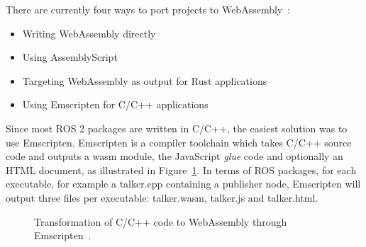     There are currently four ways to port projects to WebAssembly~\cite{portingwasm}:
    
    \begin{itemize}
        \item Writing WebAssembly directly
        \item Using AssemblyScript
        \item Targeting WebAssembly as output for Rust applications
        \item Using Emscripten for C/C++ applications
    \end{itemize}

    Since most \ac{ROS} 2 packages are written in C/C++, the easiest solution was to use Emscripten. Emscripten is a compiler toolchain which takes C/C++ source code and outputs a wasm module, the JavaScript \textit{glue} code and optionally an \ac{HTML} document, as illustrated in Figure~\ref{fig:emscripten}. In terms of \ac{ROS} packages, for each executable, for example a \textsf{talker.cpp} containing a publisher node, Emscripten will output three files per executable: \textsf{talker.wasm}, \textsf{talker.js} and \textsf{talker.html}.

    \begin{figure}[htbp]
        \centering
        \caption{Transformation of C/C++ code to WebAssembly through Emscripten~\cite{portingwasm}.}
        \label{fig:emscripten}
    \end{figure}

